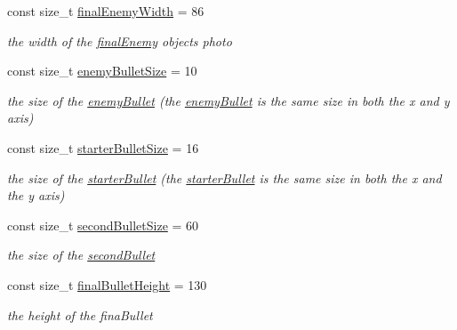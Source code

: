 \begin{DoxyCompactItemize}
const size\+\_\+t \hyperlink{structConstants_acef510139b3ea92c216c3f2d7980a7c1}{final\+Enemy\+Width} = 86
\begin{DoxyCompactList}\small\item\em the width of the \hyperlink{classfinalEnemy}{final\+Enemy} object\textquotesingle{}s photo \end{DoxyCompactList}\item 
\mbox{\label{structConstants_af331f72a52cd4c1176970629bedabe31}} 
const size\+\_\+t \hyperlink{structConstants_af331f72a52cd4c1176970629bedabe31}{enemy\+Bullet\+Size} = 10
\begin{DoxyCompactList}\small\item\em the size of the \hyperlink{classenemyBullet}{enemy\+Bullet} (the \hyperlink{classenemyBullet}{enemy\+Bullet} is the same size in both the x and y axis) \end{DoxyCompactList}\item 
\mbox{\label{structConstants_a11f7567f1a874c23c447c7be16e08edc}} 
const size\+\_\+t \hyperlink{structConstants_a11f7567f1a874c23c447c7be16e08edc}{starter\+Bullet\+Size} = 16
\begin{DoxyCompactList}\small\item\em the size of the \hyperlink{classstarterBullet}{starter\+Bullet} (the \hyperlink{classstarterBullet}{starter\+Bullet} is the same size in both the x and the y axis) \end{DoxyCompactList}\item 
\mbox{\label{structConstants_a07b9dd1f65aa3f70e09f8f845e867c3a}} 
const size\+\_\+t \hyperlink{structConstants_a07b9dd1f65aa3f70e09f8f845e867c3a}{second\+Bullet\+Size} = 60
\begin{DoxyCompactList}\small\item\em the size of the \hyperlink{classsecondBullet}{second\+Bullet} \end{DoxyCompactList}\item 
\mbox{\label{structConstants_abde3253cd79ffe95316300e006f3115c}} 
const size\+\_\+t \hyperlink{structConstants_abde3253cd79ffe95316300e006f3115c}{final\+Bullet\+Height} = 130
\begin{DoxyCompactList}\small\item\em the height of the fina\+Bullet \end{DoxyCompactList}\item 

\end{DoxyCompactItemize}
